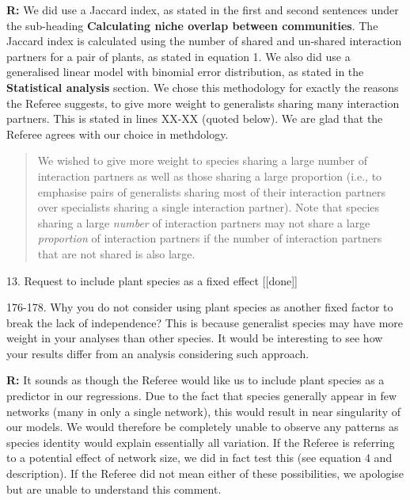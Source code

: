 \documentclass[12pt]{letter}
\newenvironment{refquote}{\bigskip \begin{it}}{\end{it}\smallskip}
\begin{document}
		\textbf{R:} We did use a Jaccard index, as stated in the first and second sentences under the sub-heading \textbf{Calculating niche overlap between communities}. The Jaccard index is calculated using the number of shared and un-shared interaction partners for a pair of plants, as stated in equation 1. We also did use a generalised linear model with binomial error distribution, as stated in the \textbf{Statistical analysis} section. We chose this methodology for exactly the reasons the Referee suggests, to give more weight to generalists sharing many interaction partners. This is stated in lines XX-XX (quoted below). We are glad that the Referee agrees with our choice in methdology.

		\begin{quotation}

			We wished to give more 
		    weight to species sharing a large number of interaction partners as well as 
		    those sharing a large proportion (i.e., to emphasise pairs of generalists 
		    sharing most of their interaction partners over specialists sharing a single 
		    interaction partner). Note that species sharing a large \emph{number} of interaction partners may not share a large \emph{proportion} of interaction partners if the number of interaction partners that are not shared is also large.

		\end{quotation}


	13. Request to include plant species as a fixed effect [[done]]

		\begin{refquote}
			176-178. Why you do not consider using plant species as another fixed factor to break the lack of independence? This is because generalist species may have more weight in your analyses than other species. It would be interesting to see how your results differ from an analysis considering such approach.
		\end{refquote}

		\textbf{R:} It sounds as though the Referee would like us to include plant species as a predictor in our regressions. Due to the fact that species generally appear in few networks (many in only a single network), this would result in near singularity of our models. We would therefore be completely unable to observe any patterns as species identity would explain essentially all variation. If the Referee is referring to a potential effect of network size, we did in fact test this (see equation 4 and description). If the Referee did not mean either of these possibilities, we apologise but are unable to understand this comment.
\end{document}
